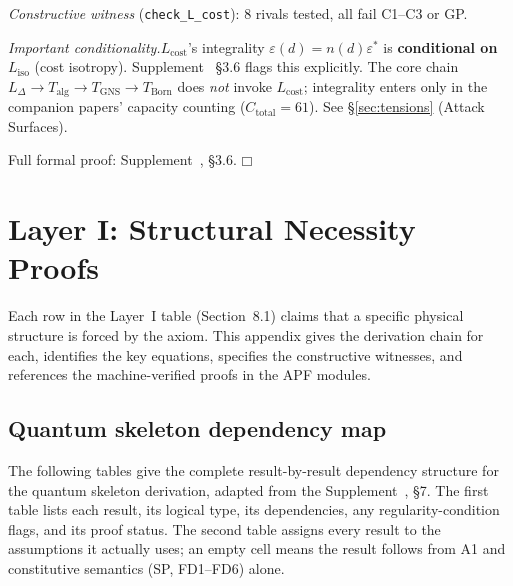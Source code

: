 \documentclass[11pt]{article}
\providecommand{\square}{\ensuremath{\mdlgwhtsquare}}
\begin{document}
\textit{Constructive witness} (\texttt{check\_L\_cost}): 8 rivals tested, all fail C1--C3 or GP.

\textit{Important conditionality.}\quad $L_{\mathrm{cost}}$'s integrality $\varepsilon(d) = n(d)\varepsilon^*$ is \textbf{conditional on $L_{\mathrm{iso}}$} (cost isotropy).  Supplement~\cite{Supp} §3.6 flags this explicitly.  The core chain $L_\Delta \to T_{\mathrm{alg}} \to T_{\mathrm{GNS}} \to T_{\mathrm{Born}}$ does \emph{not} invoke $L_{\mathrm{cost}}$; integrality enters only in the companion papers' capacity counting ($C_{\mathrm{total}} = 61$).  See §\ref{sec:tensions} (Attack Surfaces).

Full formal proof: Supplement~\cite{Supp}, §3.6. \hfill$\square$

\section{Layer I: Structural Necessity Proofs}

Each row in the Layer~I table (Section~8.1) claims that a specific physical structure is forced by the axiom.  This appendix gives the derivation chain for each, identifies the key equations, specifies the constructive witnesses, and references the machine-verified proofs in the APF modules.

\subsection{Quantum skeleton dependency map}
\label{app:depmap}

The following tables give the complete result-by-result dependency structure for the quantum skeleton derivation, adapted from the Supplement~\cite{Supp}, §7.  The first table lists each result, its logical type, its dependencies, any regularity-condition flags, and its proof status.  The second table assigns every result to the assumptions it actually uses; an empty cell means the result follows from A1 and constitutive semantics (SP, FD1--FD6) alone.
\end{document}
